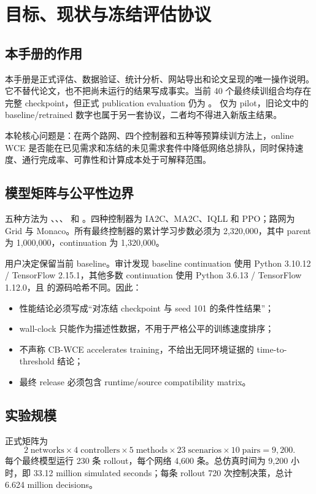 \chapter{目标、现状与冻结评估协议}

\section{本手册的作用}
本手册是正式评估、数据验证、统计分析、网站导出和论文呈现的唯一操作说明。它不替代论文，也不把尚未运行的结果写成事实。当前 40 个最终续训组合均存在完整 checkpoint，但正式 publication evaluation 仍为 。 仅为 pilot，旧论文中的 baseline/retrained 数字也属于另一套协议，二者均不得进入新版主结果。

本轮核心问题是：在两个路网、四个控制器和五种等预算续训方法上，online WCE 是否能在已见需求和冻结的未见需求套件中降低网络总排队，同时保持速度、通行完成率、可靠性和计算成本处于可解释范围。

\section{模型矩阵与公平性边界}
五种方法为 、、、 和 。四种控制器为 IA2C、MA2C、IQLL 和 PPO；路网为 Grid 与 Monaco。所有最终控制器的累计学习步数必须为 2,320,000，其中 parent 为 1,000,000，continuation 为 1,320,000。

用户决定保留当前 baseline。审计发现 baseline continuation 使用 Python 3.10.12 / TensorFlow 2.15.1，其他多数 continuation 使用 Python 3.6.13 / TensorFlow 1.12.0，且  的源码哈希不同。因此：
\begin{itemize}
  \item 性能结论必须写成“对冻结 checkpoint 与 seed 101 的条件性结果”；
  \item wall-clock 只能作为描述性数据，不用于严格公平的训练速度排序；
  \item 不声称 CB-WCE accelerates training，不给出无同环境证据的 time-to-threshold 结论；
  \item 最终 release 必须包含 runtime/source compatibility matrix。
\end{itemize}

\section{实验规模}

正式矩阵为
\[
2\;\text{networks}\times4\;\text{controllers}\times5\;\text{methods}\times23\;\text{scenarios}\times10\;\text{pairs}=9{,}200.
\]
每个最终模型运行 230 条 rollout，每个网络 4,600 条。总仿真时间为 9,200 小时，即 33.12 million simulated seconds；每条 rollout 720 次控制决策，总计 6.624 million decisions。

